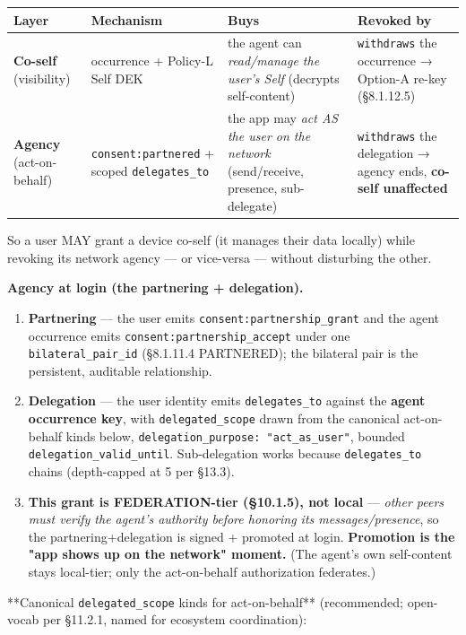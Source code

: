 \documentclass[11pt]{article}
\begin{document}
{\scriptsize
\begin{longtable}{|p{4.0cm}|p{4.0cm}|p{4.0cm}|p{4.0cm}|}\hline
\textbf{Layer} & \textbf{Mechanism} & \textbf{Buys} & \textbf{Revoked by} \\ \hline\endhead
\textbf{Co-self} (visibility) & occurrence + Policy-L Self DEK & the agent can \textit{read/manage the user's Self} (decrypts self-content) & \texttt{withdraws} the occurrence → Option-A re-key (§8.1.12.5) \\ \hline
\textbf{Agency} (act-on-behalf) & \texttt{consent:partnered} + scoped \texttt{delegates\_to} & the app may \textit{act AS the user on the network} (send/receive, presence, sub-delegate) & \texttt{withdraws} the delegation → agency ends, \textbf{co-self unaffected} \\ \hline
\end{longtable}}


So a user MAY grant a device co-self (it manages their data locally) while revoking its network agency — or vice-versa — without disturbing the other.


\textbf{Agency at login (the partnering + delegation).}

\begin{enumerate}\setlength\itemsep{0pt}
\item \textbf{Partnering} — the user emits \texttt{consent:partnership\_grant} and the agent occurrence emits \texttt{consent:partnership\_accept} under one \texttt{bilateral\_pair\_id} (§8.1.11.4 PARTNERED); the bilateral pair is the persistent, auditable relationship.
\item \textbf{Delegation} — the user identity emits \texttt{delegates\_to} against the \textbf{agent occurrence key}, with \texttt{delegated\_scope} drawn from the canonical act-on-behalf kinds below, \texttt{delegation\_purpose: "act\_as\_user"}, bounded \texttt{delegation\_valid\_until}. Sub-delegation works because \texttt{delegates\_to} chains (depth-capped at 5 per §13.3).
\item \textbf{This grant is FEDERATION-tier (§10.1.5), not local} — \textit{other peers must verify the agent's authority before honoring its messages/presence}, so the partnering+delegation is signed + promoted at login. \textbf{Promotion is the "app shows up on the network" moment.} (The agent's own self-content stays local-tier; only the act-on-behalf authorization federates.)
\end{enumerate}


**Canonical \texttt{delegated\_scope} kinds for act-on-behalf** (recommended; open-vocab per §11.2.1, named for ecosystem coordination):
\end{document}
